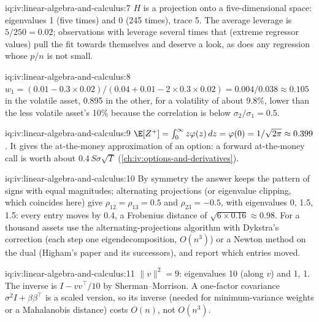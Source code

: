 \begin{solution}{iq:iv:linear-algebra-and-calculus:7}
$H$ is a projection onto a five-dimensional space: eigenvalues 1 (five times) and 0 (245 times), trace 5. The average
leverage is $5/250 = 0.02$; observations with leverage several times that (extreme regressor values) pull the fit
towards themselves and deserve a look, as does any regression whose $p/n$ is not small.
\end{solution}

\begin{solution}{iq:iv:linear-algebra-and-calculus:8}
$w_1 = (0.01 - 0.3 \times 0.02)/(0.04 + 0.01 - 2 \times 0.3 \times 0.02) = 0.004/0.038 \approx 0.105$ in the
volatile asset, 0.895 in the other, for a volatility of about 9.8\%, lower than the less volatile asset's 10\% because the
correlation is below $\sigma_2/\sigma_1 = 0.5$.
\end{solution}

\begin{solution}{iq:iv:linear-algebra-and-calculus:9}
$\E[Z^+] = \int_0^\infty z\varphi(z)\,dz = \varphi(0) = 1/\sqrt{2\pi} \approx 0.399$. It gives the at-the-money
approximation of an option: a forward at-the-money call is worth about $0.4\,S\sigma\sqrt T$
(\cref{ch:iv:options-and-derivatives}).
\end{solution}

\begin{solution}{iq:iv:linear-algebra-and-calculus:10}
By symmetry the answer keeps the pattern of signs with equal magnitudes; alternating projections (or eigenvalue
clipping, which coincides here) give $\rho_{12} = \rho_{13} = 0.5$ and $\rho_{23} = -0.5$, with eigenvalues 0, 1.5, 1.5:
every entry moves by 0.4, a Frobenius distance of $\sqrt{6 \times 0.16} \approx 0.98$. For a thousand assets use the
alternating-projections algorithm with Dykstra's correction (each step one eigendecomposition, $O(n^3)$) or a Newton
method on the dual (Higham's paper and its successors), and report which entries moved.
\end{solution}

\begin{solution}{iq:iv:linear-algebra-and-calculus:11}
$\|v\|^2 = 9$: eigenvalues 10 (along $v$) and 1, 1. The inverse is $I - vv^\top/10$ by Sherman--Morrison. A one-factor
covariance $\sigma^2 I + \beta\beta^\top$ is a scaled version, so its inverse (needed for minimum-variance weights or a
Mahalanobis distance) costs $O(n)$, not $O(n^3)$.
\end{solution}

